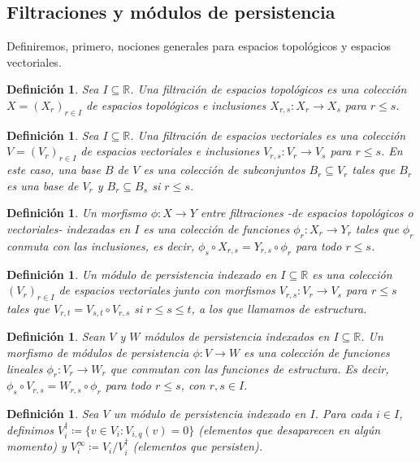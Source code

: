 \documentclass[12pt,a4paper]{article}
\newtheorem{definition}[theorem]{Definición}
\begin{document}
\subsection{Filtraciones y módulos de persistencia}
Definiremos, primero, nociones generales para espacios topológicos y espacios vectoriales.
\begin{definition}
    Sea $I \subseteq \mathbb{R}$. Una \textit{filtración} de espacios topológicos es una colección $X = (X_r)_{r \in I}$ de espacios topológicos e inclusiones $X_{r,s}: X_r \rightarrow X_s$ para $r \leq s$.
\end{definition}
\begin{definition}
    Sea $I \subseteq \mathbb{R}$. Una \textit{filtración} de espacios vectoriales es una colección $V = (V_r)_{r \in I}$ de espacios vectoriales e inclusiones $V_{r,s}: V_r \rightarrow V_s$ para $r \leq s$. En este caso, una base $B$ de $V$ es una colección de subconjuntos $B_r \subseteq V_r$ tales que $B_r$ es una base de $V_r$ y $B_r \subseteq B_s$ si $r \leq s$.
\end{definition}
\begin{definition}
    Un morfismo $\phi: X \rightarrow Y$ entre filtraciones -de espacios topológicos o vectoriales- indexadas en $I$ es una colección de funciones $\phi_r: X_r \rightarrow Y_r$ tales que $\phi_r$ conmuta con las inclusiones, es decir, $\phi_s \circ X_{r,s} = Y_{r,s} \circ \phi_r $ para todo $r \leq s$.
\end{definition}
\begin{definition}
    Un \textit{módulo de persistencia} indexado en $I \subseteq \mathbb{R}$ es una colección $(V_r)_{r \in I}$ de espacios vectoriales junto con morfismos $V_{r,s}: V_r \rightarrow V_s$ para $r \leq s$ tales que $V_{r,t} = V_{s,t} \circ V_{r,s}$ si  $r \leq s \leq t$, a los que llamamos de estructura.
\end{definition}
\begin{definition}
    Sean $V$ y $W$ módulos de persistencia indexados en $I \subseteq \mathbb{R}$. Un morfismo de módulos de persistencia $\phi:V \rightarrow W$ es una colección de funciones lineales $\phi_r : V_r \rightarrow W_r$ que conmutan con las funciones de estructura. Es decir, $\phi_s \circ V_{r,s} = W_{r,s} \circ \phi_r $ para todo $r \leq s$, con $r, s \in I$.
\end{definition}
\begin{definition}
    Sea $V$ un módulo de persistencia indexado en $I$. Para cada $i \in I$, definimos $V^\dagger_i \coloneqq \{v \in V_i :  V_{i,q}(v) = 0\}$ (elementos que desaparecen en algún momento) y $V^\infty_i \coloneqq V_i / V_i^\dagger$ (elementos que persisten).
\end{definition}
\end{document}
